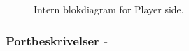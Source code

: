 \documentclass[Arkitektur/System_main.tex]{subfiles}
\begin{document}
\begin{figure}[H]
    \centering
    \caption{Intern blokdiagram for Player side.}
    \label{fig:playerside_hardware_ibd}
\end{figure}

\subsubsection{Portbeskrivelser - } \label{sec:playerside_hardware_ports}
\end{document}
